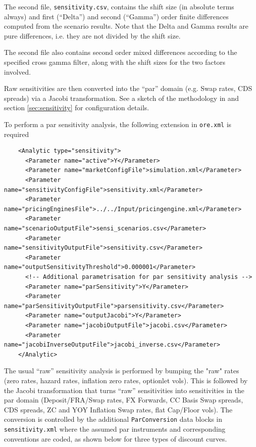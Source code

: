 The second file, {\tt sensitivity.csv}, contains the shift size (in absolute terms always) and first (``Delta'') and second
(``Gamma'') order finite differences computed from the scenario results. Note that the Delta and Gamma results are pure
differences, i.e. they are not divided by the shift size.

The second file also contains second order mixed differences according to the specified cross gamma filter, along with the shift sizes for the two factors involved.

\medskip
Raw sensitivities are then converted into the ``par'' domain (e.g. Swap rates, CDS spreads) via a Jacobi transformation. See a sketch of the 
methodology in \cite{methods} and section \ref{sec:sensitivity} for configuration details.

To perform a par sensitivity analysis, the following extension in {\tt ore.xml} is required

\begin{verbatim}
    <Analytic type="sensitivity">
      <Parameter name="active">Y</Parameter>
      <Parameter name="marketConfigFile">simulation.xml</Parameter>
      <Parameter name="sensitivityConfigFile">sensitivity.xml</Parameter>
      <Parameter name="pricingEnginesFile">../../Input/pricingengine.xml</Parameter>
      <Parameter name="scenarioOutputFile">sensi_scenarios.csv</Parameter>
      <Parameter name="sensitivityOutputFile">sensitivity.csv</Parameter>
      <Parameter name="outputSensitivityThreshold">0.000001</Parameter>
      <!-- Additional parametrisation for par sensitivity analysis -->
      <Parameter name="parSensitivity">Y</Parameter>
      <Parameter name="parSensitivityOutputFile">parsensitivity.csv</Parameter>
      <Parameter name="outputJacobi">Y</Parameter>
      <Parameter name="jacobiOutputFile">jacobi.csv</Parameter>
      <Parameter name="jacobiInverseOutputFile">jacobi_inverse.csv</Parameter>
    </Analytic>
\end{verbatim}

The usual ``raw'' sensitivity analysis is performed by bumping the "raw" rates (zero rates, hazard rates, inflation zero rates, optionlet vols).
This is followed by the Jacobi transformation that turns ``raw'' sensitivities  into sensitivities in the par domain (Deposit/FRA/Swap rates, FX Forwards, CC Basis Swap spreads, 
CDS spreads, ZC and YOY Inflation Swap rates, flat Cap/Floor vols). The conversion is controlled by the additional {\tt ParConversion} data blocks 
in {\tt sensitivity.xml} where the assumed par instruments and corresponding conventions are coded, as shown below for three types of discount curves.

